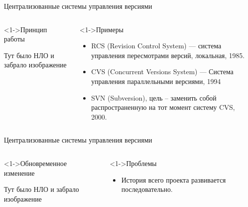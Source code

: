 \documentclass[pdf,9pt,aspectratio=169,xcolor={dvipsnames}]{beamer}
\begin{document}
\begin{frame}{Централизованные системы управления версиями}
  \begin{columns}[T]
    \begin{column}[]{0.45\textwidth}  
      \begin{exampleblock}<1->{Принцип работы}
        \begin{center}
           \Huge Тут было НЛО и забрало изображение
        \end{center}
      \end{exampleblock}
    \end{column}
    \begin{column}[]{0.45\textwidth}  
      \begin{block}<1->{Примеры}
        \begin{itemize}
          \item RCS (Revision Control System) --- система управления пересмотрами версий, локальная, 1985.
          \item CVS (Concurrent Versions System) --- Система управления параллельными версиями, 1994
          \item SVN (Subversion), цель -- заменить собой распространенную на тот момент систему CVS, 2000.
        \end{itemize}
      \end{block}
    \end{column}
  \end{columns}
  \vfill
\end{frame}

\begin{frame}{Централизованные системы управления версиями}
  \begin{columns}[T]
    \begin{column}[]{0.45\textwidth}  
      \begin{exampleblock}<1->{Обновременное изменение}
        \begin{center}
           \Huge Тут было НЛО и забрало изображение
        \end{center}
      \end{exampleblock}
    \end{column}
    \begin{column}[]{0.45\textwidth}  
      \begin{alertblock}<1->{Проблемы}
        \begin{itemize}
          \item История всего проекта развивается последовательно.
        \end{itemize}
      \end{alertblock}
    \end{column}
  \end{columns}
  \vfill
\end{frame}
\end{document}

